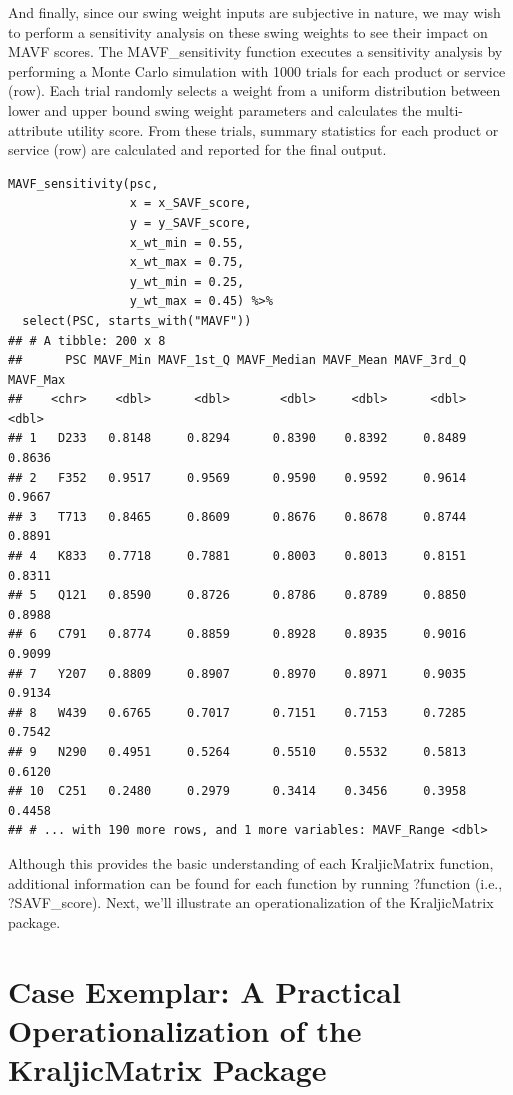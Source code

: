 \documentclass[twocolumn]{svjour3}       %
\begin{document}
And finally, since our swing weight inputs are subjective in nature, we may wish to perform a sensitivity analysis on these swing weights to see their impact on MAVF scores. The MAVF\_sensitivity function executes a sensitivity analysis by performing a Monte Carlo simulation with 1000 trials for each product or service (row). Each trial randomly selects a weight from a uniform distribution between lower and upper bound swing weight parameters and calculates the multi-attribute utility score. From these trials, summary statistics for each product or service (row) are calculated and reported for the final output. 
\begin{Verbatim}[fontsize=\footnotesize]
MAVF_sensitivity(psc,
                 x = x_SAVF_score,
                 y = y_SAVF_score,
                 x_wt_min = 0.55,
                 x_wt_max = 0.75,
                 y_wt_min = 0.25,
                 y_wt_max = 0.45) %>%
  select(PSC, starts_with("MAVF"))
## # A tibble: 200 x 8
##      PSC MAVF_Min MAVF_1st_Q MAVF_Median MAVF_Mean MAVF_3rd_Q MAVF_Max
##    <chr>    <dbl>      <dbl>       <dbl>     <dbl>      <dbl>    <dbl>
## 1   D233   0.8148     0.8294      0.8390    0.8392     0.8489   0.8636
## 2   F352   0.9517     0.9569      0.9590    0.9592     0.9614   0.9667
## 3   T713   0.8465     0.8609      0.8676    0.8678     0.8744   0.8891
## 4   K833   0.7718     0.7881      0.8003    0.8013     0.8151   0.8311
## 5   Q121   0.8590     0.8726      0.8786    0.8789     0.8850   0.8988
## 6   C791   0.8774     0.8859      0.8928    0.8935     0.9016   0.9099
## 7   Y207   0.8809     0.8907      0.8970    0.8971     0.9035   0.9134
## 8   W439   0.6765     0.7017      0.7151    0.7153     0.7285   0.7542
## 9   N290   0.4951     0.5264      0.5510    0.5532     0.5813   0.6120
## 10  C251   0.2480     0.2979      0.3414    0.3456     0.3958   0.4458
## # ... with 190 more rows, and 1 more variables: MAVF_Range <dbl>
\end{Verbatim}

Although this provides the basic understanding of each KraljicMatrix function, additional information can be found for each function by running ?function (i.e., ?SAVF\_score).  Next, we'll illustrate an operationalization of the KraljicMatrix package. 


\section{Case Exemplar: A Practical Operationalization of the KraljicMatrix Package}
\label{sec:5}
\end{document}
